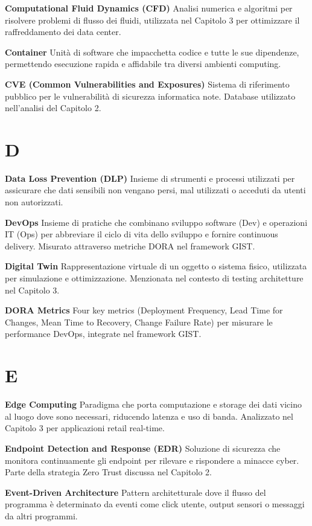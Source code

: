 \documentclass[12pt,a4paper,oneside]{book}
\numberwithin{figure}{chapter} %
\numberwithin{table}{chapter}  %
\begin{document}
\textbf{Computational Fluid Dynamics (CFD)} Analisi numerica e algoritmi
per risolvere problemi di flusso dei fluidi, utilizzata nel Capitolo 3
per ottimizzare il raffreddamento dei data center.

\textbf{Container} Unità di software che impacchetta codice e tutte le
sue dipendenze, permettendo esecuzione rapida e affidabile tra diversi
ambienti computing.

\textbf{CVE (Common Vulnerabilities and Exposures)} Sistema di
riferimento pubblico per le vulnerabilità di sicurezza informatica note.
Database utilizzato nell'analisi del Capitolo 2.

\section{D}\label{d}

\textbf{Data Loss Prevention (DLP)} Insieme di strumenti e processi
utilizzati per assicurare che dati sensibili non vengano persi, mal
utilizzati o acceduti da utenti non autorizzati.

\textbf{DevOps} Insieme di pratiche che combinano sviluppo software
(Dev) e operazioni IT (Ops) per abbreviare il ciclo di vita dello
sviluppo e fornire continuous delivery. Misurato attraverso metriche
DORA nel framework GIST.

\textbf{Digital Twin} Rappresentazione virtuale di un oggetto o sistema
fisico, utilizzata per simulazione e ottimizzazione. Menzionata nel
contesto di testing architetture nel Capitolo 3.

\textbf{DORA Metrics} Four key metrics (Deployment Frequency, Lead Time
for Changes, Mean Time to Recovery, Change Failure Rate) per misurare le
performance DevOps, integrate nel framework GIST.

\section{E}\label{e}

\textbf{Edge Computing} Paradigma che porta computazione e storage dei
dati vicino al luogo dove sono necessari, riducendo latenza e uso di
banda. Analizzato nel Capitolo 3 per applicazioni retail real-time.

\textbf{Endpoint Detection and Response (EDR)} Soluzione di sicurezza
che monitora continuamente gli endpoint per rilevare e rispondere a
minacce cyber. Parte della strategia Zero Trust discussa nel Capitolo 2.

\textbf{Event-Driven Architecture} Pattern architetturale dove il flusso
del programma è determinato da eventi come click utente, output sensori
o messaggi da altri programmi.
\end{document}
